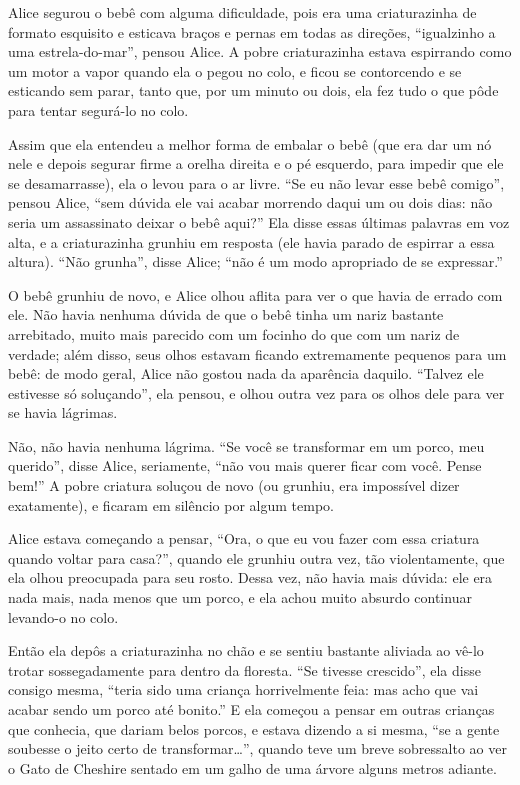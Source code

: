 Alice segurou o bebê com alguma dificuldade, pois era uma criaturazinha
de formato esquisito e esticava braços e pernas em todas as direções,
``igualzinho a uma estrela-do-mar'', pensou Alice. A pobre criaturazinha
estava espirrando como um motor a vapor quando ela o pegou no colo, e
ficou se contorcendo e se esticando sem parar, tanto que, por um minuto
ou dois, ela fez tudo o que pôde para tentar segurá-lo no colo.

Assim que ela entendeu a melhor forma de embalar o bebê (que era dar um
nó nele e depois segurar firme a orelha direita e o pé esquerdo, para
impedir que ele se desamarrasse), ela o levou para o ar livre. ``Se eu
não levar esse bebê comigo'', pensou Alice, ``sem dúvida ele vai acabar
morrendo daqui um ou dois dias: não seria um assassinato deixar o bebê
aqui?'' Ela disse essas últimas palavras em voz alta, e a criaturazinha
grunhiu em resposta (ele havia parado de espirrar a essa altura). ``Não
grunha'', disse Alice; ``não é um modo apropriado de se expressar.''

O bebê grunhiu de novo, e Alice olhou aflita para ver o que havia de
errado com ele. Não havia nenhuma dúvida de que o bebê tinha um nariz
bastante arrebitado, muito mais parecido com um focinho do que com um
nariz de verdade; além disso, seus olhos estavam ficando extremamente
pequenos para um bebê: de modo geral, Alice não gostou nada da aparência
daquilo. ``Talvez ele estivesse só soluçando'', ela pensou, e olhou
outra vez para os olhos dele para ver se havia lágrimas.

Não, não havia nenhuma lágrima. ``Se você se transformar em um porco,
meu querido'', disse Alice, seriamente, ``não vou mais querer ficar com
você. Pense bem!'' A pobre criatura soluçou de novo (ou grunhiu, era
impossível dizer exatamente), e ficaram em silêncio por algum tempo.

Alice estava começando a pensar, ``Ora, o que eu vou fazer com essa
criatura quando voltar para casa?'', quando ele grunhiu outra vez, tão
violentamente, que ela olhou preocupada para seu rosto. Dessa vez, não
havia mais dúvida: ele era nada mais, nada menos que um porco, e ela
achou muito absurdo continuar levando-o no colo.

Então ela depôs a criaturazinha no chão e se sentiu bastante aliviada
ao vê-lo trotar sossegadamente para dentro da floresta. ``Se tivesse
crescido'', ela disse consigo mesma, ``teria sido uma criança
horrivelmente feia: mas acho que vai acabar sendo um porco até bonito.''
E ela começou a pensar em outras crianças que conhecia, que dariam belos
porcos, e estava dizendo a si mesma, ``se a gente soubesse o jeito certo
de transformar\ldots{}'', quando teve um breve sobressalto ao ver o Gato de
Cheshire sentado em um galho de uma árvore alguns metros adiante.

